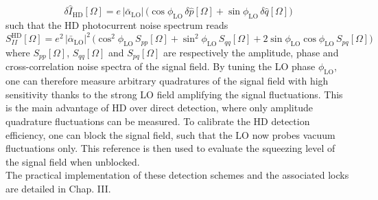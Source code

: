 \begin{equation}
    \delta \hat I_{\mathrm{HD}}[\Omega] = e \, |\bar \alpha_{\mathrm{LO}}| \, \big( \cos \phi_{\mathrm{LO}} \, \delta \hat p[\Omega] + \sin \phi_{\mathrm{LO}} \, \delta \hat q[\Omega] \big)
\end{equation}
such that the HD photocurrent noise spectrum reads
\begin{equation}
    S_{II}^{\mathrm{HD}}[\Omega] =  e^2 \, |\bar \alpha_{\mathrm{LO}}|^2 \, \big( \cos^2 \phi_{\mathrm{LO}} \, S_{pp}[\Omega] + \sin^2 \phi_{\mathrm{LO}} \, S_{qq}[\Omega] + 2 \sin \phi_{\mathrm{LO}} \cos \phi_{\mathrm{LO}} \, S_{pq}[\Omega] \big)
\end{equation}
where $S_{pp}[\Omega]$, $S_{qq}[\Omega]$ and $S_{pq}[\Omega]$ are respectively the amplitude, phase and cross-correlation noise spectra of the signal field. By tuning the LO phase $\phi_{\mathrm{LO}}$, one can therefore measure arbitrary quadratures of the signal field with high sensitivity thanks to the strong LO field amplifying the signal fluctuations. This is the main advantage of HD over direct detection, where only amplitude quadrature fluctuations can be measured. To calibrate the HD detection efficiency, one can block the signal field, such that the LO now probes vacuum fluctuations only. This reference is then used to evaluate the squeezing level of the signal field when unblocked. \\ 

The practical implementation of these detection schemes and the associated locks are detailed in Chap. III. 

  






